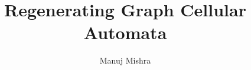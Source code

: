 \documentclass[a4paper, twoside]{report}
\title{Regenerating Graph Cellular Automata}
\author{Manuj Mishra}
\begin{document}




\tableofcontents
\listoffigures
\listofalgorithms










\end{document}
